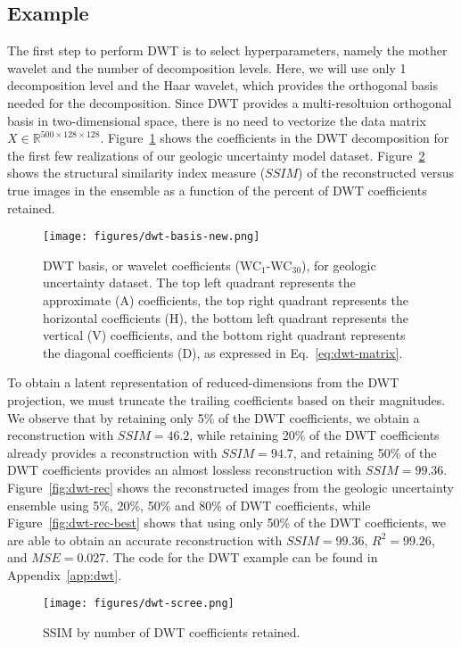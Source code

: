 \documentclass[a4paper,fleqn,12pt]{article}
\begin{document}
\subsection*{Example}
The first step to perform DWT is to select hyperparameters, namely the mother wavelet and the number of decomposition levels. Here, we will use only 1 decomposition level and the Haar wavelet, which provides the orthogonal basis needed for the decomposition. Since DWT provides a multi-resoltuion orthogonal basis in two-dimensional space, there is no need to vectorize the data matrix $X\in\mathbb{R}^{500\times128\times128}$. Figure~\ref{fig:dwt-basis} shows the coefficients in the DWT decomposition for the first few realizations of our geologic uncertainty model dataset. Figure~\ref{fig:dwt-scree} shows the structural similarity index measure ($SSIM$) of the reconstructed versus true images in the ensemble as a function of the percent of DWT coefficients retained. 

\begin{figure}[H]
    \centering
    \texttt{[image: figures/dwt-basis-new.png]}
    \caption{DWT basis, or wavelet coefficients (WC$_1$-WC$_{30}$), for geologic uncertainty dataset. The top left quadrant represents the approximate (A) coefficients, the top right quadrant represents the horizontal coefficients (H), the bottom left quadrant represents the vertical (V) coefficients, and the bottom right quadrant represents the diagonal coefficients (D), as expressed in Eq.~\ref{eq:dwt-matrix}.}
    \label{fig:dwt-basis}
\end{figure}

To obtain a latent representation of reduced-dimensions from the DWT projection, we must truncate the trailing coefficients based on their magnitudes. We observe that by retaining only 5\% of the DWT coefficients, we obtain a reconstruction with $SSIM=46.2$, while retaining 20\% of the DWT coefficients already provides a reconstruction with $SSIM=94.7$, and retaining 50\% of the DWT coefficients provides an almost lossless reconstruction with $SSIM=99.36$. Figure~\ref{fig:dwt-rec} shows the reconstructed images from the geologic uncertainty ensemble using 5\%, 20\%, 50\% and 80\% of DWT coefficients, while Figure~\ref{fig:dwt-rec-best} shows that using only 50\% of the DWT coefficients, we are able to obtain an accurate reconstruction with $SSIM=99.36$, $R^2=99.26$, and $MSE=0.027$. The code for the DWT example can be found in Appendix~\ref{app:dwt}.

\begin{figure}[H]
    \centering
    \texttt{[image: figures/dwt-scree.png]}
    \caption{SSIM by number of DWT coefficients retained.}
    \label{fig:dwt-scree}
\end{figure}
\end{document}

